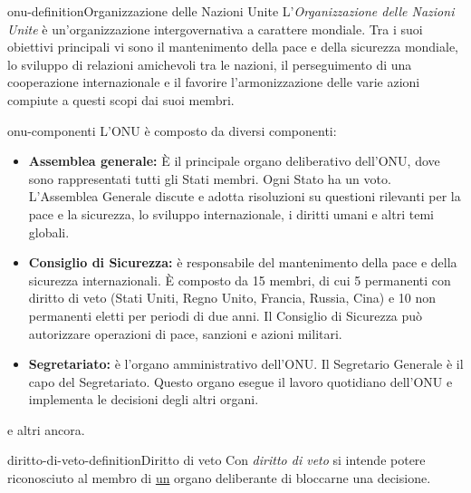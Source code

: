 \documentclass[preview]{standalone}
\begin{document}
\begin{snippetdefinition}{onu-definition}{Organizzazione delle Nazioni Unite}
    L'\textit{Organizzazione delle Nazioni Unite}
    è un'organizzazione intergovernativa a carattere mondiale.
    Tra i suoi obiettivi principali vi sono il mantenimento della pace e
    della sicurezza mondiale, lo sviluppo di relazioni amichevoli tra le nazioni,
    il perseguimento di una cooperazione internazionale e il favorire
    l'armonizzazione delle varie azioni compiute a questi scopi dai suoi membri.
\end{snippetdefinition}


\begin{snippet}{onu-componenti}
    L'ONU è composto da diversi componenti:
    \begin{itemize}
        \item \textbf{Assemblea generale:}
            È il principale organo deliberativo dell'ONU, dove sono rappresentati
            tutti gli Stati membri. Ogni Stato ha un voto.
            L'Assemblea Generale discute e adotta risoluzioni su questioni rilevanti per
            la pace e la sicurezza, lo sviluppo internazionale, i diritti umani e
            altri temi globali.
        \item \textbf{Consiglio di Sicurezza:}
            è responsabile del mantenimento della pace e della
            sicurezza internazionali.
            È composto da 15 membri, di cui 5 permanenti con diritto di veto
            (Stati Uniti, Regno Unito, Francia, Russia, Cina) e 10 non permanenti eletti
            per periodi di due anni. Il Consiglio di Sicurezza può autorizzare
            operazioni di pace, sanzioni e azioni militari.
        \item \textbf{Segretariato:}
            è l'organo amministrativo dell'ONU. Il Segretario Generale
            è il capo del Segretariato. Questo organo esegue il lavoro quotidiano dell'ONU e implementa le decisioni degli altri organi.
    \end{itemize}
    e altri ancora.
\end{snippet}


\begin{snippetdefinition}{diritto-di-veto-definition}{Diritto di veto}
    Con \textit{diritto di veto} si intende
    potere riconosciuto al membro di \underline{un} organo deliberante di bloccarne una decisione. 
\end{snippetdefinition}
\end{document}
